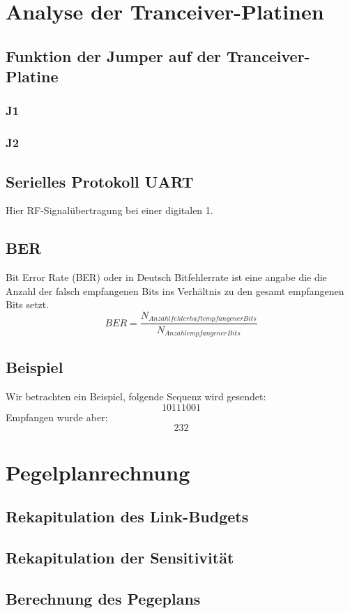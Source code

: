 \section{Analyse der Tranceiver-Platinen}
\subsection{Funktion der Jumper auf der Tranceiver-Platine}
\subsubsection{J1}
\subsubsection{J2}
\subsection{Serielles Protokoll UART}
Hier RF-Signalübertragung bei einer digitalen 1.
\subsection{BER}
Bit Error Rate (BER) oder in Deutsch Bitfehlerrate ist eine angabe die die
Anzahl der falsch empfangenen Bits ins Verhältnis zu den gesamt empfangenen Bits setzt.
\begin{equation}
    BER = \frac{N_{Anzahl fehlerhaft empfangener Bits}}{N_{Anzahl empfangener Bits}}
\end{equation}
\subsection{Beispiel}
Wir betrachten ein Beispiel, folgende Sequenz wird gesendet:
\begin{equation}
    10111001
\end{equation}
Empfangen wurde aber:
\begin{equation}
      232

\end{equation}

\section{Pegelplanrechnung}
\subsection{Rekapitulation des Link-Budgets}
\subsection{Rekapitulation der Sensitivität}
\subsection{Berechnung des Pegeplans}